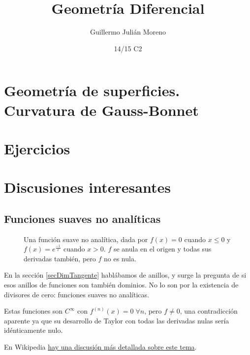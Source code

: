 \documentclass{apuntes}
\title{Geometría Diferencial}
\author{Guillermo Julián Moreno}
\date{14/15 C2}
\begin{document}
\pagestyle{plain}
\maketitle

\tableofcontents
\newpage






\chapter{Geometría de superficies. Curvatura de Gauss-Bonnet}


\appendix

\chapter{Ejercicios}


\chapter{Discusiones interesantes}

\section{Funciones suaves no analíticas}

\begin{figure}[hbtp]
\centering
{}
\caption{Una función suave no analítica, dada por $f(x) = 0$ cuando $x ≤ 0$ y $f(x) = e^{\frac{-1}{x}}$ cuando $x > 0$. $f$ se anula en el origen y todas sus derivadas también, pero $f$ no es nula.}
\end{figure}

En la sección \ref{secDimTangente} hablábamos de anillos, y surge la pregunta de si esos anillos de funciones son también dominios. No lo son por la existencia de divisores de cero: funciones suaves no analíticas.

Estas funciones son $C^∞$ con $f^{(n)}(x) = 0\; ∀n$, pero $f ≠ 0$, una contradicción aparente ya que su desarrollo de Taylor con todas las derivadas nulas sería idénticamente nulo.

En Wikipedia \href{http://en.wikipedia.org/wiki/Non-analytic_smooth_function}{hay una discusión más detallada sobre este tema}.
\end{document}

